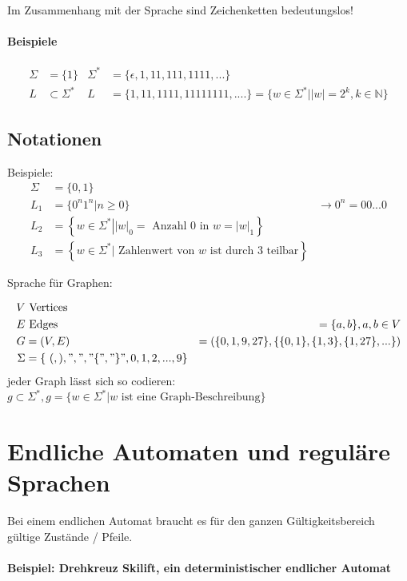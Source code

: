 Im Zusammenhang mit der Sprache sind Zeichenketten bedeutungslos!

\paragraph{Beispiele}

\begin{align*}
	\Sigma &= \{1\} & \Sigma^\ast &= \{\epsilon, 1,11,111,1111,...\} \\
	L &\subset \Sigma^\ast  & L &=\{1,11,1111,11111111,....\} = \{w \in \Sigma^\ast| |w|=2^k, k \in \mathbb{N}\}
\end{align*}


\subsection{Notationen}
Beispiele:
\begin{align*}
	\Sigma &= \{0,1\} \\
	L_1 &= \{0^n 1^n | n \geq 0\} &\rightarrow 0^n = 00...0 \\
	L_2 &= \left\{ w \in \Sigma^\ast \left| \left|w\right|_0 = \text{ Anzahl 0 in } w = \left|w\right|_1 \right.\right\} \\
	L_3 &= \left\{w \in \Sigma^\ast \left| \text{ Zahlenwert von } w \text{ ist durch 3 teilbar} \right.\right\}
\end{align*}

Sprache für Graphen:

\begin{align*}
V & \text{ Vertices} \\
E & \text{ Edges} &= \{a,b\}, a,b \in V \\
G &= (V, E) &= (\{0,1,9,27\},\{\{0,1\},\{1,3\},\{1,27\},...\}) \\
\Sigma &= \left\{\ (,),",","\{","\}", 0, 1,2,...,9 \right\}
\end{align*}
jeder Graph lässt sich so codieren: $g \subset \Sigma^\ast, g = \{w \in \Sigma^\ast \left| w \text{ ist eine Graph-Beschreibung} \right.\}$

\section{Endliche Automaten und reguläre Sprachen}

Bei einem endlichen Automat braucht es für den ganzen Gültigkeitsbereich gültige Zustände / Pfeile.

\paragraph{Beispiel: Drehkreuz Skilift, ein deterministischer endlicher Automat}

